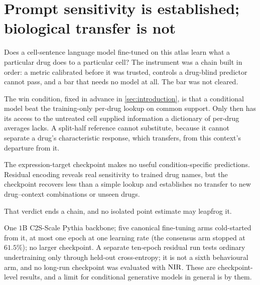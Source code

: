 
\chapter{Prompt sensitivity is established; biological transfer is not}
\label{sec:conclusions}


\begin{question}
Does a cell-sentence language model fine-tuned on this atlas learn what a
particular drug does to a particular cell? The instrument was a chain built
in order: a metric calibrated before it was trusted, controls a drug-blind
predictor cannot pass, and a bar that needs no model at all. The bar was not
cleared.
\end{question}

\noindent
The win condition, fixed in advance in \cref{sec:introduction}, is that a
conditional model beat the training-only per-drug lookup on common support. Only
then has its access to the untreated cell supplied information a dictionary of
per-drug averages lacks. A split-half reference cannot substitute, because it
cannot separate a drug's characteristic response, which transfers, from this
context's departure from it.

The expression-target checkpoint makes no useful condition-specific predictions.
Residual encoding reveals real sensitivity to trained drug names, but the
checkpoint recovers less than a simple lookup and establishes no transfer to new
drug--context combinations or unseen drugs.

That verdict ends a chain, and no isolated point estimate may leapfrog it.

\begin{scopelimit}
One $1$B C2S-Scale Pythia backbone; five canonical fine-tuning arms cold-started
from it, at most one epoch at one learning rate (the consensus arm stopped at
$61.5\%$); no larger checkpoint. A separate ten-epoch residual run tests ordinary
undertraining only through held-out cross-entropy; it is not a sixth behavioural
arm, and no long-run checkpoint was evaluated with $\textrm{NIR}$. These are
checkpoint-level results, and a limit for conditional generative models in
general is \notestablished by them.
\end{scopelimit}

